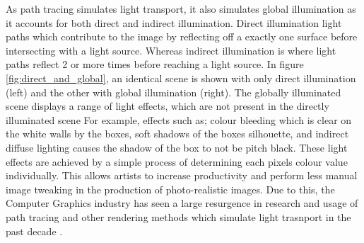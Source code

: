 \documentclass[../dissertation.tex]{subfiles}
\begin{document}
As path tracing simulates light transport, it also simulates global illumination as it accounts for both direct and indirect illumination. Direct illumination light paths which contribute to the image by reflecting off a exactly one surface before intersecting with a light source. Whereas  indirect illumination is where light paths reflect 2 or more times before reaching a light source. In figure \ref{fig:direct_and_global}, an identical scene is shown with only direct illumination (left) and the other with global illumination (right). The globally illuminated scene displays a range of light effects, which are not present in the directly illuminated scene  For example, effects such as; colour bleeding which is clear on the white walls by the boxes, soft shadows of the boxes silhouette, and indirect diffuse lighting causes the shadow of the box to not be pitch black. These light effects are achieved by a simple process of determining each pixels colour value individually. This allows artists to increase productivity and perform less manual image tweaking in the production of photo-realistic images. Due to this, the Computer Graphics industry has seen a large resurgence in research and usage of path tracing and other rendering methods which simulate light trasnport in the past decade \cite{krivanek2014recent}.
\end{document}
